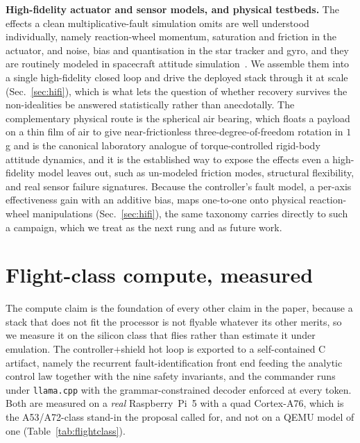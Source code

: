 \documentclass[11pt]{article}
\begin{document}
\noindent\textbf{High-fidelity actuator and sensor models, and physical testbeds.} The effects a
clean multiplicative-fault simulation omits are well understood individually, namely
reaction-wheel momentum, saturation and friction in the actuator, and noise, bias and
quantisation in the star tracker and gyro, and they are routinely modeled in spacecraft attitude
simulation~\cite{Schaub2018,Wie2008}. We assemble them into a single high-fidelity closed loop and
drive the deployed stack through it at scale (Sec.~\ref{sec:hifi}), which is what lets the
question of whether recovery survives the non-idealities be answered statistically rather than
anecdotally. The complementary physical route is the spherical air bearing, which floats a payload
on a thin film of air to give near-frictionless three-degree-of-freedom rotation in $1$\,g and is
the canonical laboratory analogue of torque-controlled rigid-body attitude dynamics, and it is the
established way to expose the effects even a high-fidelity model leaves out, such as un-modeled
friction modes, structural flexibility, and real sensor failure signatures. Because the
controller's fault model, a per-axis effectiveness gain with an additive bias, maps one-to-one
onto physical reaction-wheel manipulations (Sec.~\ref{sec:hifi}), the same taxonomy carries
directly to such a campaign, which we treat as the next rung and as future work.

\section{Flight-class compute, measured}
\label{sec:compute}
The compute claim is the foundation of every other claim in the paper, because a stack that does
not fit the processor is not flyable whatever its other merits, so we measure it on the silicon
class that flies rather than estimate it under emulation. The controller$+$shield hot loop is
exported to a self-contained C artifact, namely the recurrent fault-identification front end
feeding the analytic control law together with the nine safety invariants, and the commander runs
under \texttt{llama.cpp} with the grammar-constrained decoder enforced at every token. Both are
measured on a \emph{real} Raspberry~Pi~5 with a quad Cortex-A76, which is the A53/A72-class
stand-in the proposal called for, and not on a QEMU model of one (Table~\ref{tab:flightclass}).
\end{document}
